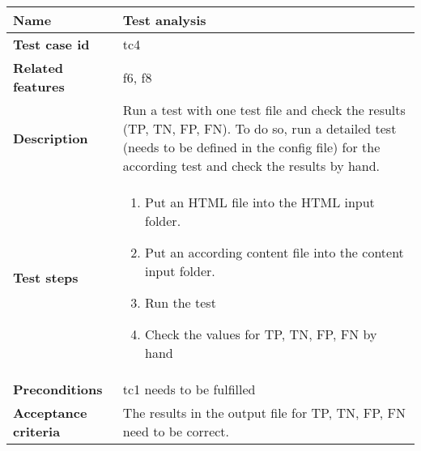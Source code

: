 	\begin{tabular}{ | p{3.5cm} | p{12cm} |}
	\hline
	\textbf{Name} 					& Test analysis 		 		\\ 	\hline
	\textbf{Test case id} 			& tc4 							\\ 	\hline
	\textbf{Related features}		& f6, f8							\\ 	\hline
	\textbf{Description} 			& Run a test with one test file and check the results (TP, TN, FP, FN). To do so, run a detailed test (needs to be defined in the config file) for the according test and check the results by hand. \\ 	\hline
	\textbf{Test steps} 			& 	\begin{enumerate}
											\item{Put an HTML file into the HTML input folder.}
											\item{Put an according content file into the content input folder.}
											\item{Run the test}
											\item{Check the values for TP, TN, FP, FN by hand}
										\end{enumerate}
																\\ 	\hline
	\textbf{Preconditions} 			& tc1 needs to be fulfilled	\\ 	\hline
	\textbf{Acceptance criteria} 	& The results in the output file for TP, TN, FP, FN need to be correct.						\\ 	\hline
	\end{tabular} \\





